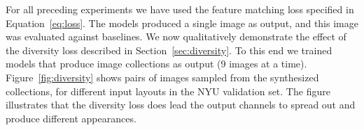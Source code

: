 For all preceding experiments we have used the feature matching loss specified in Equation~\ref{eq:loss}. The models produced a single image as output, and this image was evaluated against baselines. We now qualitatively demonstrate the effect of the diversity loss described in Section~\ref{sec:diversity}. To this end we trained models that produce image collections as output (9 images at a time). Figure~\ref{fig:diversity} shows pairs of images sampled from the synthesized collections, for different input layouts in the NYU validation set. The figure illustrates that the diversity loss does lead the output channels to spread out and produce different appearances.



